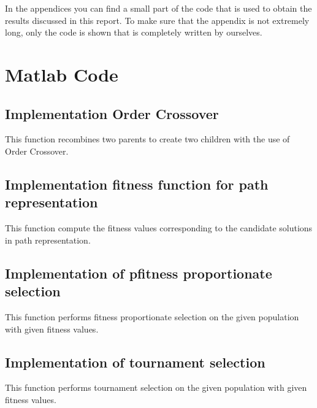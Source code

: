 


\begin{appendices}


In the appendices you can find a small part of the code that is used to obtain the results discussed in this report. To make sure that the appendix is not extremely long, only the code is shown that is completely written by ourselves. 

\section*{Matlab Code}


\subsection*{Implementation Order Crossover}
This function recombines two parents to create two children with the use of Order Crossover. 



\subsection*{Implementation fitness function for path representation}
This function compute the fitness values corresponding to the candidate solutions in path representation.


\subsection*{Implementation of pfitness proportionate selection}
This function performs fitness proportionate selection on the given population with given fitness values.


\subsection*{Implementation of tournament selection}
This function performs tournament selection on the given population with given fitness values.








\end{appendices}
